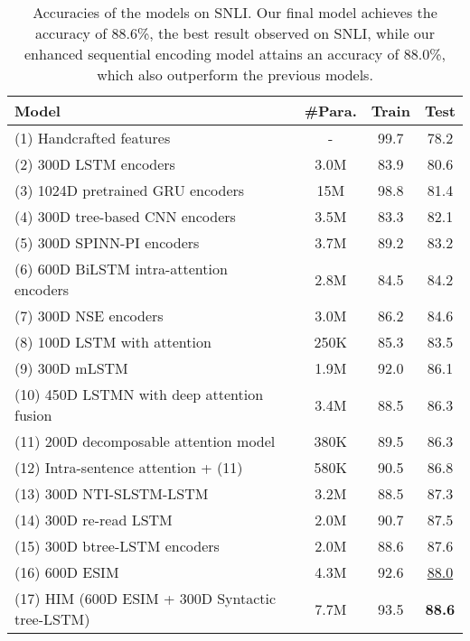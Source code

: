 \documentclass[11pt,a4paper]{article}
\begin{document}
\begin{table*}[ht]
	\renewcommand{\arraystretch}{0.9}
	\centering
	\begin{tabular}{lccc}
		\toprule
		Model    & \#Para.    &  Train  &  Test  \\
		\midrule
		(1) Handcrafted features~\citep{Bowman:D15-1075} & -  &  99.7  & 78.2 \\
		\midrule
		(2) 300D LSTM encoders~\citep{Bowman:P16-1139}     & 3.0M &  83.9  & 80.6 \\
		(3) 1024D pretrained GRU encoders~\citep{DBLP:journals/corr/VendrovKFU15} & 15M & 98.8 & 81.4 \\
		(4) 300D tree-based CNN encoders~\citep{Mou:P16-2022} & 3.5M & 83.3 & 82.1 \\
		(5) 300D SPINN-PI encoders~\citep{Bowman:P16-1139} & 3.7M & 89.2 & 83.2 \\ 
		(6) 600D BiLSTM intra-attention encoders~\citep{DBLP:journals/corr/LiuSLW16} & 2.8M & 84.5 & 84.2 \\ 
		(7) 300D NSE encoders~\citep{DBLP:journals/corr/MunkhdalaiY16} & 3.0M & 86.2 & 84.6 \\
		\midrule
		(8) 100D LSTM with attention~\citep{DBLP:journals/corr/RocktaschelGHKB15}  & 250K    & 85.3 & 83.5 \\
		(9) 300D mLSTM~\citep{Wang:N16-1170}  & 1.9M    & 92.0 & 86.1 \\        
		(10) 450D LSTMN with deep attention fusion~\citep{Cheng:D16-1053}  & 3.4M    & 88.5 & 86.3 \\
		(11) 200D decomposable attention model~\citep{Parikh:D16-1244}  & 380K    & 89.5 & 86.3 \\
		(12) Intra-sentence attention + (11)~\citep{Parikh:D16-1244}  & 580K    & 90.5 & 86.8 \\
		(13) 300D NTI-SLSTM-LSTM~\citep{DBLP:journals/corr/MunkhdalaiY16b}  & 3.2M    & 88.5 & 87.3 \\
        (14) 300D re-read LSTM~\citep{Sha:C16-1270}  & 2.0M    & 90.7 &  87.5 \\
        (15) 300D btree-LSTM encoders~\citep{DBLP:journals/corr/PariaADCP16}  & 2.0M    & 88.6 &  87.6 \\
		\midrule
		(16) 600D ESIM & 4.3M & 92.6 & \underline{88.0} \\
		(17) HIM (600D ESIM + 300D Syntactic tree-LSTM) & 7.7M & 93.5 & \textbf{88.6} \\
		\bottomrule
	\end{tabular}
	\caption{Accuracies of the models on SNLI. Our final model achieves the accuracy of 88.6\%, the best result observed on SNLI, while our enhanced sequential encoding model attains an accuracy of 88.0\%, which also outperform the previous models.}
	\label{tab:result}
\end{table*}
\end{document}
